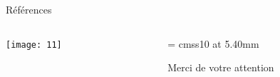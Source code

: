 \documentclass[french]{beamer}
\begin{document}
\begin{frame}{Références}
\tiny


    

\end{frame}
\begin{frame}

  \begin{columns}
    \begin{column}{0.70\textwidth}
      \begin{center}
        \texttt{[image: 11]}          
      \end{center}
    \end{column}
    \begin{column}{0.30\textwidth}
      \begin{center}

        \font\endfont = cmss10 at 5.40mm
\color[rgb]{0.00,0.00,1.00}       \endfont 
        \baselineskip 7.0mm

        Merci de votre attention

      \end{center}    

    \end{column}
  \end{columns}

\end{frame}
\end{document}
